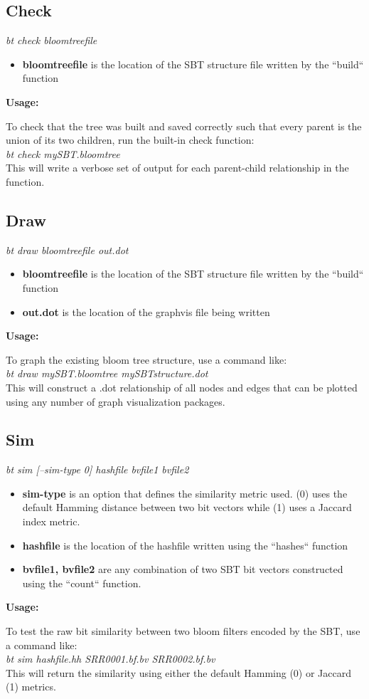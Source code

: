 \documentclass{article}
\begin{document}
\subsection{Check}
\textit{bt check bloomtreefile}
\begin{itemize}
\item \textbf{bloomtreefile} is the location of the SBT structure file written by the ``build`` function
\end{itemize}
\textbf{Usage:}

To check that the tree was built and saved correctly such that every parent is the union of its two children, run the built-in check function: \\

\textit{bt check mySBT.bloomtree} \\

This will write a verbose set of output for each parent-child relationship in the function.

\subsection{Draw}
\textit{bt draw bloomtreefile out.dot}
\begin{itemize}
\item \textbf{bloomtreefile} is the location of the SBT structure file written by the ``build`` function
\item \textbf{out.dot} is the location of the graphvis file being written
\end{itemize}
\textbf{Usage:}

To graph the existing bloom tree structure, use a command like: \\

\textit{bt draw mySBT.bloomtree mySBTstructure.dot} \\

This will construct a .dot relationship of all nodes and edges that can be plotted using any number of graph visualization packages. %


\subsection{Sim}
\textit{bt sim [--sim-type 0] hashfile bvfile1 bvfile2}
\begin{itemize}
\item \textbf{sim-type} is an option that defines the similarity metric used. (0) uses the default Hamming distance between two bit vectors while (1) uses a Jaccard index metric.
\item \textbf{hashfile} is the location of the hashfile written using the ``hashes`` function
\item \textbf{bvfile1, bvfile2} are any combination of two SBT bit vectors constructed using the ``count`` function.
\end{itemize}
\textbf{Usage:}

To test the raw bit similarity between two bloom filters encoded by the SBT, use a command like: \\

\textit{bt sim hashfile.hh SRR0001.bf.bv SRR0002.bf.bv} \\

This will return the similarity using either the default Hamming (0) or Jaccard (1) metrics.
\end{document}
